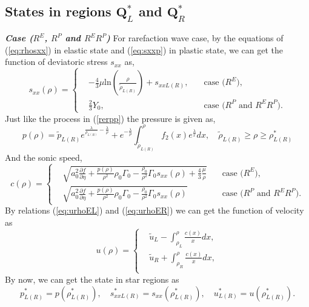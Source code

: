 \documentclass{article}
\numberwithin{equation}{section}
\numberwithin{table}{section}
\begin{document}
 \subsection{States in regions $\mathbf{Q}_{L}^*$  and  $\mathbf{Q}_{R}^*$}\label{sec:functions}

\emph{\textbf{Case ($R^E$, $R^P$ and $R^ER^P$)}} For rarefaction wave case, by the equations of  (\ref{eq:rhosxx}) in elastic state  and  (\ref{eq:sxxp}) in plastic state, we can get
the function of  deviatoric stress $s_{xx}$ as,
\begin{equation}
  s_{xx}(\rho) = \left\{\begin{aligned}
	  & -\frac{4}{3}\mu\text{ln}\left(\frac{\rho}{\tilde{\rho}_{L(R)}}\right)+s_{xxL(R)},  \quad &\text{case ($R^E$)},\\
	  & \frac{2}{3}Y_0 ,  \quad &\text{case ($R^P$ and $R^ER^P$)}.
  \end{aligned} \right.
  \end{equation}
Just like the process in (\ref{rerpp}) the pressure is given as,
\begin{equation}
  p(\rho)=\tilde{p}_{L(R)}e^{\frac{\lambda}{\rho_{L(R)}}-\frac{\lambda}{\rho}} +e^{-\frac{\lambda}{\rho}}\int_{\tilde{\rho}_{L(R)}}^{\rho} f_2(x) e^{\frac{\lambda}{x}}dx, \quad   \tilde{\rho}_{L(R)} \ge \rho \ge \rho_{L(R)}^*
\end{equation}
And the  sonic speed,
\begin{equation}
  c(\rho) = \left\{ \begin{aligned}
	&  \sqrt{a_0^2 \frac{\partial f}{\partial \eta} + \frac{p(\rho)}{\rho^2}\rho_0\Gamma_0 -\frac{\rho_0}{\rho^2}\Gamma_0 s_{xx}(\rho) +\frac{4}{3}\frac{\mu}{\rho}} \quad & \text{case ($R^E$)},\\
	&	\sqrt{a_0^2 \frac{\partial f}{\partial \eta} + \frac{p(\rho)}{\rho^2}\rho_0\Gamma_0 -\frac{\rho_0}{\rho^2}\Gamma_0 s_{xx}(\rho)}  \quad  & \text{case ($R^P$ and  $R^ER^P$)}.
	\end{aligned}\right.
\end{equation}
 By relations (\ref{eq:urhoEL}) and (\ref{eq:urhoER})
 we can get  the  function of  velocity as
\begin{equation}
  u(\rho) =\left\{ \begin{aligned}
	  &\tilde{u}_L - \int_{\rho_L}^{\rho} \frac{c(x)}{x} dx,  \\
	  &\tilde{u}_R + \int_{\rho_R}^{\rho} \frac{c(x)}{x} dx, \\
	\end{aligned}
  \right.
\end{equation}
By now, we can get the state in star regions as
\begin{equation}
  p^*_{L(R)} = p(\rho_{L(R)}^*),\quad s_{xxL(R)}^* = s_{xx}(\rho_{L(R)}^*),\quad  u^*_{L(R)} = u(\rho_{L(R)}^*).
\end{equation}
\end{document}
